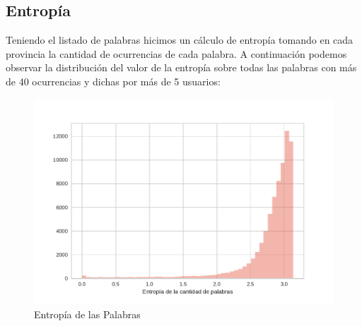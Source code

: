 






\subsection{Entropía}
Teniendo el listado de palabras hicimos un cálculo de entropía tomando en cada provincia la cantidad de ocurrencias de cada palabra. A continuación podemos observar la distribución del valor de la entropía sobre todas las palabras con más de 40 ocurrencias y dichas por más de 5 usuarios:


\begin{figure}[ht]
\centering
\includegraphics[width=1.0\textwidth]{./images/DistribucionEntropia.pdf}
\caption{Entropía de las Palabras} 
\label{fig:entropiaPalabras} 
\end{figure}

